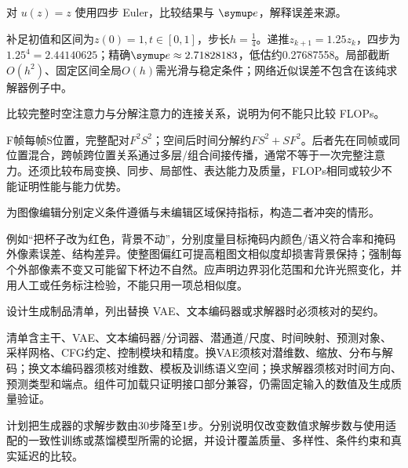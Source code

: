 \begin{exercises}
\begin{exercise}\optional 对 $u(z)=z$ 使用四步 Euler，比较结果与 $\conste$，解释误差来源。

\begin{solution}
补足初值和区间为$z(0)=1,t\in[0,1]$，步长$h=\frac{1}{4}$。递推$z_{k+1}=1.25z_k$，四步为$1.25^4=2.44140625$；精确$\conste\approx2.71828183$，低估约0.27687558。局部截断$O(h^2)$、固定区间全局$O(h)$需光滑与稳定条件；网络近似误差不包含在该纯求解器例子中。
\end{solution}
\end{exercise}

\begin{exercise}\optional 比较完整时空注意力与分解注意力的连接关系，说明为何不能只比较 FLOPs。

\begin{solution}
F帧每帧S位置，完整配对$F^2S^2$；空间后时间分解约$FS^2+SF^2$。后者先在同帧或同位置混合，跨帧跨位置关系通过多层/组合间接传播，通常不等于一次完整注意力。还须比较布局变换、同步、局部性、表达能力及质量，FLOPs相同或较少不能证明性能与能力优势。
\end{solution}
\end{exercise}

\begin{exercise}\optional 为图像编辑分别定义条件遵循与未编辑区域保持指标，构造二者冲突的情形。

\begin{solution}
例如“把杯子改为红色，背景不动”，分别度量目标掩码内颜色/语义符合率和掩码外像素误差、结构差异。使整图偏红可提高粗图文相似度却损害背景保持；强制每个外部像素不变又可能留下杯边不自然。应声明边界羽化范围和允许光照变化，并用人工或任务标注检验，不能只用一项总相似度。
\end{solution}
\end{exercise}

\begin{exercise} 设计生成制品清单，列出替换 VAE、文本编码器或求解器时必须核对的契约。

\begin{solution}
清单含主干、VAE、文本编码器/分词器、潜通道/尺度、时间映射、预测对象、采样网格、CFG约定、控制模块和精度。换VAE须核对潜维数、缩放、分布与解码；换文本编码器须核对维数、模板及训练语义空间；换求解器须核对时间方向、预测类型和端点。组件可加载只证明接口部分兼容，仍需固定输入的数值及生成质量验证。
\end{solution}
\end{exercise}

\begin{exercise}\optional 计划把生成器的求解步数由30步降至1步。分别说明仅改变数值求解步数与使用适配的一致性训练或蒸馏模型所需的论据，并设计覆盖质量、多样性、条件约束和真实延迟的比较。


\end{exercise}
\end{exercises}
